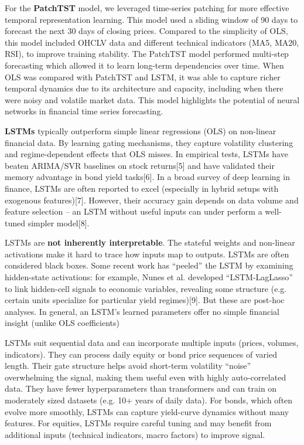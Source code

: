 \documentclass[conference]{IEEEtran}
\begin{document}
For the \textbf{PatchTST} model, we leveraged time-series patching for more effective temporal representation learning. This model used a sliding window of 90 days to forecast the next 30 days of closing prices. Compared to the simplicity of OLS, this model included OHCLV data and different technical indicators (MA5, MA20, RSI), to improve training stability. The PatchTST model performed multi-step forecasting which allowed it to learn long-term dependencies over time. When OLS was compared with PatchTST and LSTM, it was able to capture richer temporal dynamics due to its architecture and capacity, including when there were noisy and volatile market data. This model highlights the potential of neural networks in financial time series forecasting. 

\textbf{LSTMs} typically outperform simple linear regressions (OLS) on non-linear financial data. By learning gating mechanisms, they capture volatility clustering and regime-dependent effects that OLS misses. In empirical tests, LSTMs have beaten ARIMA/SVR baselines on stock returns[5] and have validated their memory advantage in bond yield tasks[6]. In a broad survey of deep learning in finance, LSTMs are often reported to excel (especially in hybrid setups with exogenous features)[7]. However, their accuracy gain depends on data volume and feature selection – an LSTM without useful inputs can under perform a well-tuned simpler model[8].

LSTMs are \textbf{not inherently interpretable}. The stateful weights and non-linear activations make it hard to trace how inputs map to outputs. LSTMs are often considered black boxes. Some recent work has “peeled” the LSTM by examining hidden-state activations: for example, Nunes et al. developed “LSTM-LagLasso” to link hidden-cell signals to economic variables, revealing some structure (e.g. certain units specialize for particular yield regimes)[9]. But these are post-hoc analyses. In general, an LSTM’s learned parameters offer no simple financial insight (unlike OLS coefficients)

LSTMs suit sequential data and can incorporate multiple inputs (prices, volumes, indicators). They can process daily equity or bond price sequences of varied length. Their gate structure helps avoid short-term volatility “noise” overwhelming the signal, making them useful even with highly auto-correlated data. They have fewer hyperparameters than transformers and can train on moderately sized datasets (e.g. 10+ years of daily data). For bonds, which often evolve more smoothly, LSTMs can capture yield-curve dynamics without many features. For equities, LSTMs require careful tuning and may benefit from additional inputs (technical indicators, macro factors) to improve signal.
\end{document}
